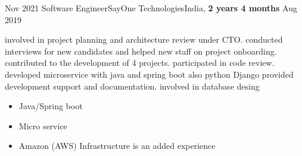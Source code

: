 \begin{experiences}
  \experience
  {Nov 2021}   {Software Engineer}{SayOne Technologies}{India,  \textbf{ 2 years 4 months}}
  {Aug 2019}   {
                      involved in project planning and architecture review under CTO.
                      conducted interviews for new candidates and helped new staff on project onboarding.
                      contributed to the development of 4 projects.
                      participated in code review.
                      developed microservice with java and spring boot also python Django
                      provided development support and documentation. 
                      involved in database desing
                      \begin{itemize}
                        \item Java/Spring boot 
                        \item Micro service 
                        \item Amazon (AWS) Infrastructure is an added experience

\end{itemize}}
\end{experiences}
